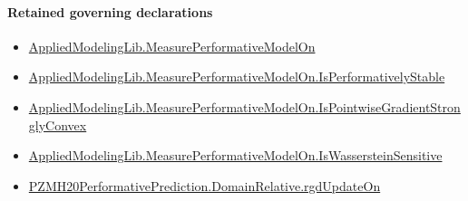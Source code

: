 \documentclass[10pt]{article}
\begin{document}
\paragraph{Retained governing declarations}
\begin{itemize}\raggedright
\item \hyperlink{library-prerequisite-e14cc5e8b1e1460e}{Applied\allowbreak{}Modeling\allowbreak{}Lib.\allowbreak{}Measure\allowbreak{}Performative\allowbreak{}Model\allowbreak{}On}
\item \hyperlink{library-prerequisite-4af6c70f954a80a0}{Applied\allowbreak{}Modeling\allowbreak{}Lib.\allowbreak{}Measure\allowbreak{}Performative\allowbreak{}Model\allowbreak{}On.\allowbreak{}Is\allowbreak{}Performatively\allowbreak{}Stable}
\item \hyperlink{library-prerequisite-eb9ab8e4235e1d28}{Applied\allowbreak{}Modeling\allowbreak{}Lib.\allowbreak{}Measure\allowbreak{}Performative\allowbreak{}Model\allowbreak{}On.\allowbreak{}Is\allowbreak{}Pointwise\allowbreak{}Gradient\allowbreak{}Strongly\allowbreak{}Convex}
\item \hyperlink{library-prerequisite-0e1e192eee739a4b}{Applied\allowbreak{}Modeling\allowbreak{}Lib.\allowbreak{}Measure\allowbreak{}Performative\allowbreak{}Model\allowbreak{}On.\allowbreak{}Is\allowbreak{}Wasserstein\allowbreak{}Sensitive}
\item \hyperlink{governing-declaration-5c643b5dcfecba23}{PZMH20\allowbreak{}Performative\allowbreak{}Prediction.\allowbreak{}Domain\allowbreak{}Relative.\allowbreak{}rgd\allowbreak{}Update\allowbreak{}On}
\end{itemize}
\end{document}
